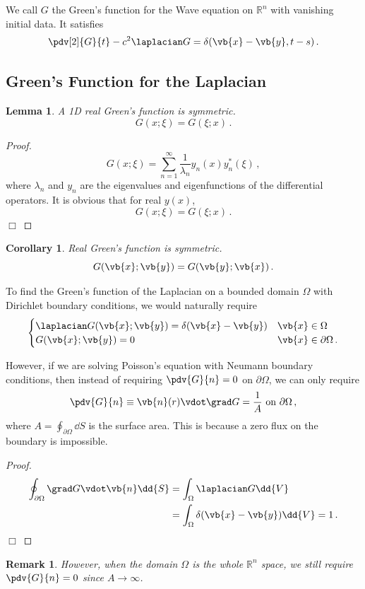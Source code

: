 \documentclass{article}
\theoremstyle{plain}\theoremheaderfont{\normalfont\itshape}\theorembodyfont{\rmfamily}\theoremseparator{.}\newtheorem*{rem}{Remark}\newtheorem*{ex}{Example}\newtheorem*{proof}{Proof}\newtheorem*{altp}{Alternative proof}
\theoremstyle{plain}\theoremheaderfont{\normalfont\bfseries}\theorembodyfont{\rmfamily}\theoremseparator{.}\newtheorem{thm}{Theorem}[section]\newtheorem{lem}[thm]{Lemma}\newtheorem{prop}[thm]{Proposition}\newtheorem*{cor}{Corollary}\newtheorem{defn}[thm]{Definition}\newtheorem{clm}[thm]{Claim}\newtheorem{clminproof}{Claim}
\theoremstyle{break}\theoremheaderfont{\normalfont\itshape}\theorembodyfont{\rmfamily}\theoremseparator{.\medskip}\newtheorem*{proofskip}{Proof}\newtheorem*{exs}{Examples}\newtheorem*{rems}{Remarks}
\theoremstyle{break}\theoremheaderfont{\normalfont\bfseries}\theorembodyfont{\rmfamily}\theoremseparator{.\medskip}\newtheorem{lemskip}[thm]{Lemma}\newtheorem{defnskip}[thm]{Definition}\newtheorem{propskip}[thm]{Proposition}\newtheorem{thmskip}[thm]{Theorem}
\numberwithin{equation}{section}
\newcommand{\qed}{\hfill\ensuremath{\Box}}
\begin{document}
	We call \(G\) the Green's function for the Wave equation on \(\mathbb{R}^n\) with vanishing initial data. It satisfies
	\[\pdv[2]{G}{t}-c^2\laplacian G=\delta(\vb{x}-\vb{y},t-s)\,.\]

	\subsection{Green's Function for the Laplacian}
	\begin{lem}
		A 1D real Green's function is symmetric.
		\[G(x;\xi)=G(\xi;x)\,.\]
	\end{lem}
	\begin{proof}
		\[G(x;\xi)=\sum_{n=1}^{\infty}\frac{1}{\lambda_n}y_n(x)y_n^*(\xi)\,,\]
		where \(\lambda_n\) and \(y_n\) are the eigenvalues and eigenfunctions of the differential operators. It is obvious that for real \(y(x)\), 
		\[G(x;\xi)=G(\xi;x)\,.\]\qed
	\end{proof}
	\begin{cor}
		Real Green's function is symmetric.
		\[G(\vb{x};\vb{y})=G(\vb{y};\vb{x})\,.\]
	\end{cor}

	To find the Green's function of the Laplacian on a bounded domain \(\Omega\) with Dirichlet boundary conditions, we would naturally require
	\[\begin{cases}
		\laplacian G(\vb{x};\vb{y})=\delta(\vb{x}-\vb{y}) & \vb{x}\in\Omega\\
		G(\vb{x};\vb{y})= 0 & \vb{x}\in\partial\Omega\,.
	\end{cases}\]

	However, if we are solving Poisson's equation with Neumann boundary conditions, then instead of requiring \(\pdv{G}{n}=0\) on \(\partial\Omega\), we can only require
	\[\pdv{G}{n}\equiv\vb{n}(r)\vdot\grad G=\frac{1}{A}\text{ on }\partial\Omega\,,\]
	where \(A=\oint_{\partial\Omega}\dd{S}\) is the surface area. This is because a zero flux on the boundary is impossible. 
	\begin{proof}
		\begin{align*}
			\oint_{\partial\Omega}\grad G\vdot\vb{n}\dd{S}&=\int_\Omega\laplacian G\dd{V}\\
			&=\int_\Omega\delta(\vb{x}-\vb{y})\dd{V}=1\,.
		\end{align*}\qed
	\end{proof}
	\begin{rem}
		However, when the domain \(\Omega\) is the whole \(\mathbb{R}^n\) space, we still require \(\pdv{G}{n}=0\) since \(A\to\infty\).
	\end{rem}
\end{document}
